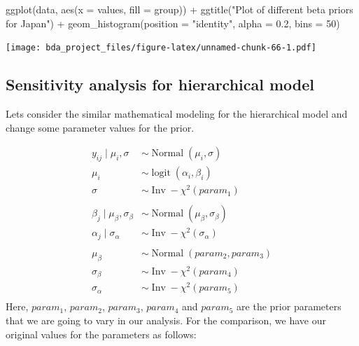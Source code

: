 \documentclass[
]{article}
\newenvironment{Shaded}{\begin{snugshade}}{\end{snugshade}}
\newcommand{\AttributeTok}[1]{\textcolor[rgb]{0.77,0.63,0.00}{#1}}
\newcommand{\DecValTok}[1]{\textcolor[rgb]{0.00,0.00,0.81}{#1}}
\newcommand{\FloatTok}[1]{\textcolor[rgb]{0.00,0.00,0.81}{#1}}
\newcommand{\FunctionTok}[1]{\textcolor[rgb]{0.00,0.00,0.00}{#1}}
\newcommand{\NormalTok}[1]{#1}
\newcommand{\SpecialCharTok}[1]{\textcolor[rgb]{0.00,0.00,0.00}{#1}}
\newcommand{\StringTok}[1]{\textcolor[rgb]{0.31,0.60,0.02}{#1}}
\begin{document}
\begin{Shaded}
\begin{Highlighting}[]
\FunctionTok{ggplot}\NormalTok{(data, }\FunctionTok{aes}\NormalTok{(}\AttributeTok{x =}\NormalTok{ values, }\AttributeTok{fill =}\NormalTok{ group)) }\SpecialCharTok{+} 
  \FunctionTok{ggtitle}\NormalTok{(}\StringTok{"Plot of different beta priors for Japan"}\NormalTok{) }\SpecialCharTok{+}
  \FunctionTok{geom\_histogram}\NormalTok{(}\AttributeTok{position =} \StringTok{"identity"}\NormalTok{, }\AttributeTok{alpha =} \FloatTok{0.2}\NormalTok{, }\AttributeTok{bins =} \DecValTok{50}\NormalTok{)}
\end{Highlighting}
\end{Shaded}

\texttt{[image: bda\_project\_files/figure-latex/unnamed-chunk-66-1.pdf]}

\hypertarget{sensitivity-analysis-for-hierarchical-model}{%
\subsection{Sensitivity analysis for hierarchical
model}\label{sensitivity-analysis-for-hierarchical-model}}

Lets consider the similar mathematical modeling for the hierarchical
model and change some parameter values for the prior.

\[
\begin{aligned}
y_{i j} \mid \mu_i, \sigma &\sim \operatorname{Normal}\left(\mu_i, \sigma\right) \\
\mu_i &\sim \operatorname{logit}(\alpha_i, \beta_i)\\
\sigma & \sim \operatorname{Inv}-\chi^{2}(param_1) \\
\\
\beta_{j}\mid \mu_{\beta}, \sigma_{\beta} &\sim \operatorname{Normal}(\mu_{\beta}, \sigma_{\beta})\\
\alpha_{j} \mid \sigma_{\alpha} & \sim \operatorname{Inv}-\chi^{2}\left(\sigma_{\alpha}\right) \\
\\
\mu_{\beta} & \sim \operatorname{Normal}(param_2,param_3)\\
\sigma_{\beta} & \sim \operatorname{Inv}-\chi^{2}(param_4) \\
\sigma_{\alpha} & \sim \operatorname{Inv}-\chi^{2}(param_5) \\
\end{aligned}
\] Here, \(param_1\), \(param_2\), \(param_3\), \(param_4\) and
\(param_5\) are the prior parameters that we are going to vary in our
analysis. For the comparison, we have our original values for the
parameters as follows:
\end{document}
